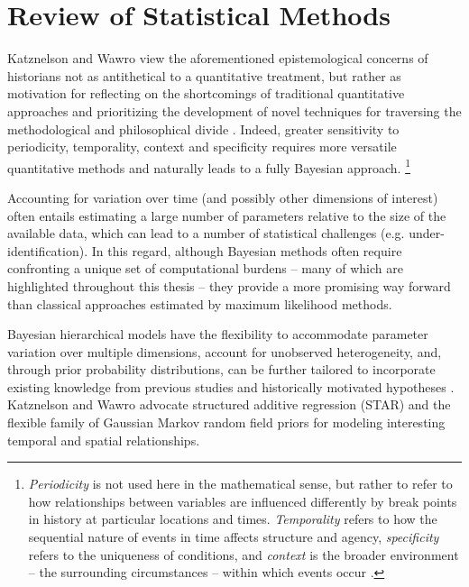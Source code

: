 
\chapter{Review of Statistical Methods}
\label{lit_review}



Katznelson and Wawro view the aforementioned epistemological concerns of historians not as 
antithetical to a quantitative treatment, but rather as motivation for reflecting on the 
shortcomings of traditional quantitative approaches and prioritizing the development
of novel techniques for traversing the methodological and philosophical divide 
. 
Indeed, greater sensitivity to periodicity, temporality, context and specificity requires  
more versatile quantitative methods and naturally leads to a fully Bayesian approach.%
\footnote{ 
{\it Periodicity} is not used here in the mathematical sense, but rather to refer to how relationships 
between variables are influenced differently by break points in history at particular locations and times. 
{\it Temporality} refers to how the sequential nature of events in time affects structure and agency, 
{\it specificity} refers to the uniqueness of conditions, and
{\it context} is the broader environment -- the surrounding circumstances -- within which events occur
.
} %

Accounting for variation over time (and possibly other dimensions of interest) often entails 
estimating a large number of parameters relative to the size of the available data, which can lead 
to a number of statistical challenges (e.g. under-identification). In this regard, although Bayesian 
methods often require confronting a unique set of computational burdens -- many of which are 
highlighted throughout this thesis -- they provide a more promising way forward than 
classical approaches estimated by maximum likelihood methods. 

Bayesian hierarchical models have the flexibility to accommodate parameter 
variation over multiple dimensions, account for unobserved heterogeneity, and, 
through prior probability distributions, can be further tailored to incorporate existing 
knowledge from previous studies and historically motivated hypotheses 
. 
Katznelson and Wawro advocate structured additive regression (STAR) 
and the flexible family of Gaussian Markov random field priors for modeling interesting 
temporal and spatial relationships. 

